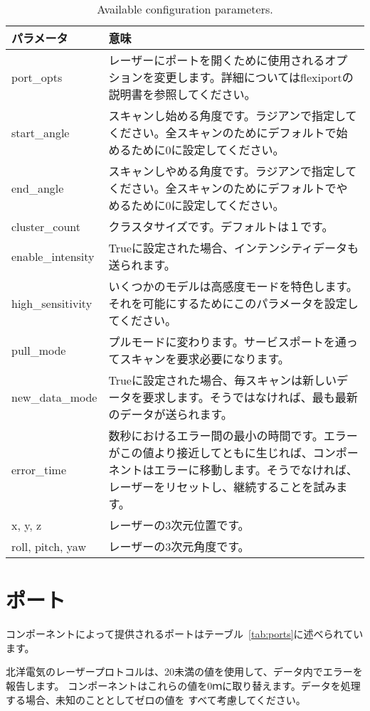 \documentclass[a4paper,10pt]{article}
\newenvironment{Japanese}{%
  \CJKfamily{min}%
  \CJKtilde
  \CJKnospace}{}
\begin{document}
\begin{CJK}{UTF8}{}
\begin{Japanese}
\begin{table}[t]
  \centering
  \begin{tabularx}{\columnwidth}{lX}
    \toprule
    パラメータ & 意味 \\
    \midrule
    port\_opts & レーザーにポートを開くために使用されるオプションを変更します。詳細についてはflexiportの説明書を参照してください。 \\
    start\_angle & スキャンし始める角度です。ラジアンで指定してください。全スキャンのためにデフォルトで始めるために0に設定してください。 \\
    end\_angle & スキャンしやめる角度です。ラジアンで指定してください。全スキャンのためにデフォルトでやめるために0に設定してください。 \\
    cluster\_count & クラスタサイズです。デフォルトは１です。 \\
    enable\_intensity & Trueに設定された場合、インテンシティデータも送られます。 \\
    high\_sensitivity & いくつかのモデルは高感度モードを特色します。それを可能にするためにこのパラメータを設定してください。 \\
    pull\_mode & プルモードに変わります。サービスポートを通ってスキャンを要求必要になります。 \\
    new\_data\_mode & Trueに設定された場合、毎スキャンは新しいデータを要求します。そうではなければ、最も最新のデータが送られます。 \\
    error\_time & 数秒におけるエラー間の最小の時間です。エラーがこの値より接近してともに生じれば、コンポーネントはエラーに移動します。そうでなければ、レーザーをリセットし、継続することを試みます。 \\
    x, y, z & レーザーの3次元位置です。 \\
    roll, pitch, yaw & レーザーの3次元角度です。 \\
    \bottomrule
  \end{tabularx}
  \caption{Available configuration parameters.}
  \label{tab:config_params}
\end{table}

\section{ポート}
\label{sec:port}

コンポーネントによって提供されるポートはテーブル~\ref{tab:ports}に述べられています。

北洋電気のレーザープロトコルは、20未満の値を使用して、データ内でエラーを報告します。
コンポーネントはこれらの値を0ｍに取り替えます。データを処理する場合、未知のこととしてゼロの値を
すべて考慮してください。


\end{Japanese}
\end{CJK}
\end{document}
